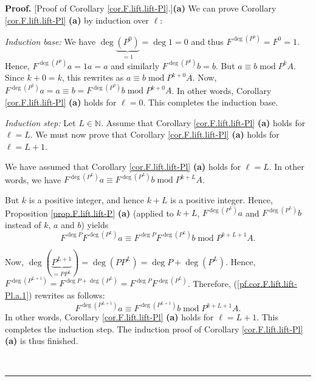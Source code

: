 \documentclass[numbers=enddot,12pt,final,onecolumn,notitlepage]{scrartcl}%
\theoremstyle{definition}
\newenvironment{proof}[1][Proof]{\noindent\textbf{#1.} }{\ \rule{0.5em}{0.5em}}
\begin{document}
\begin{proof}
[Proof of Corollary \ref{cor.F.lift.lift-Pl}.]\textbf{(a)} We can prove
Corollary \ref{cor.F.lift.lift-Pl} \textbf{(a)} by induction over $\ell$:

\textit{Induction base:} We have $\deg\underbrace{\left(  P^{0}\right)  }%
_{=1}=\deg1=0$ and thus $F^{\deg\left(  P^{0}\right)  }=F^{0}=1$. Hence,
$F^{\deg\left(  P^{0}\right)  }a=1a=a$ and similarly $F^{\deg\left(
P^{0}\right)  }b=b$. But $a\equiv b\operatorname{mod}P^{k}A$. Since $k+0=k$,
this rewrites as $a\equiv b\operatorname{mod}P^{k+0}A$. Now, $F^{\deg\left(
P^{0}\right)  }a=a\equiv b=F^{\deg\left(  P^{0}\right)  }b\operatorname{mod}%
P^{k+0}A$. In other words, Corollary \ref{cor.F.lift.lift-Pl} \textbf{(a)}
holds for $\ell=0$. This completes the induction base.

\textit{Induction step:} Let $L\in\mathbb{N}$. Assume that Corollary
\ref{cor.F.lift.lift-Pl} \textbf{(a)} holds for $\ell=L$. We must now prove
that Corollary \ref{cor.F.lift.lift-Pl} \textbf{(a)} holds for $\ell=L+1$.

We have assumed that Corollary \ref{cor.F.lift.lift-Pl} \textbf{(a)} holds for
$\ell=L$. In other words, we have $F^{\deg\left(  P^{L}\right)  }a\equiv
F^{\deg\left(  P^{L}\right)  }b\operatorname{mod}P^{k+L}A$.

But $k$ is a positive integer, and hence $k+L$ is a positive integer. Hence,
Proposition \ref{prop.F.lift.lift-P} \textbf{(a)} (applied to $k+L$,
$F^{\deg\left(  P^{L}\right)  }a$ and $F^{\deg\left(  P^{L}\right)  }b$
instead of $k$, $a$ and $b$) yields
\begin{equation}
F^{\deg P}F^{\deg\left(  P^{L}\right)  }a\equiv F^{\deg P}F^{\deg\left(
P^{L}\right)  }b\operatorname{mod}P^{k+L+1}A.
\label{pf.cor.F.lift.lift-Pl.a.1}%
\end{equation}


Now, $\deg\left(  \underbrace{P^{L+1}}_{=PP^{L}}\right)  =\deg\left(
PP^{L}\right)  =\deg P+\deg\left(  P^{L}\right)  $. Hence, $F^{\deg\left(
P^{L+1}\right)  }=F^{\deg P+\deg\left(  P^{L}\right)  }=F^{\deg P}%
F^{\deg\left(  P^{L}\right)  }$. Therefore, (\ref{pf.cor.F.lift.lift-Pl.a.1})
rewrites as follows:%
\[
F^{\deg\left(  P^{L+1}\right)  }a\equiv F^{\deg\left(  P^{L+1}\right)
}b\operatorname{mod}P^{k+L+1}A.
\]
In other words, Corollary \ref{cor.F.lift.lift-Pl} \textbf{(a)} holds for
$\ell=L+1$. This completes the induction step. The induction proof of
Corollary \ref{cor.F.lift.lift-Pl} \textbf{(a)} is thus finished.


\end{proof}
\end{document}
